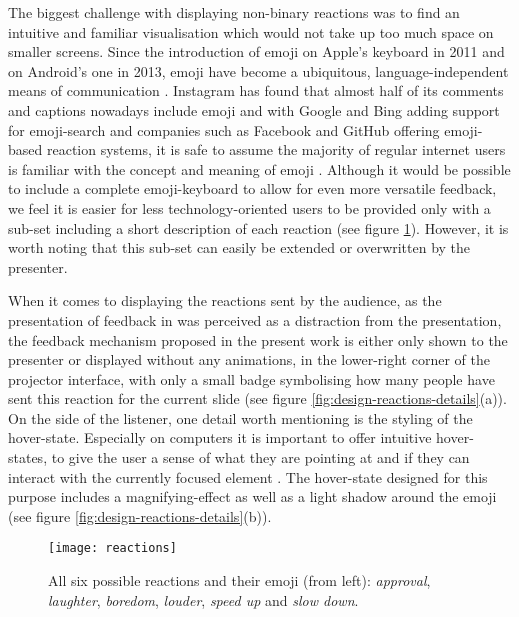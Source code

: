 The biggest challenge with displaying non-binary reactions was to find an intuitive and familiar visualisation which would not take up too much space on smaller screens. Since the introduction of emoji on Apple's keyboard in 2011 and on Android's one in 2013, emoji have become a ubiquitous, language-independent means of communication \cite{Instagramm:Emoji, Cappallo:ImageToEmoji}. Instagram has found that almost half of its comments and captions nowadays include emoji \cite{Instagramm:Emoji} and with Google \cite{Google:Emoji} and Bing \cite{Bing:Emoji} adding support for emoji-search and companies such as Facebook \cite{Facebook:Reactions} and GitHub \cite{Github:Reactions} offering emoji-based reaction systems, it is safe to assume the majority of regular internet users is familiar with the concept and meaning of emoji \cite{Cappallo:EmojiVideoSearch}. Although it would be possible to include a complete emoji-keyboard to allow for even more versatile feedback, we feel it is easier for less technology-oriented users to be provided only with a sub-set including a short description of each reaction (see figure \ref{fig:design-reactions}). However, it is worth noting that this sub-set can easily be extended or overwritten by the presenter.

When it comes to displaying the reactions sent by the audience, as the presentation of feedback in \cite{Teevan:MobileFeedbackDuringPresentation} was perceived as a distraction from the presentation, the feedback mechanism proposed in the present work is either only shown to the presenter or displayed without any animations, in the lower-right corner of the projector interface, with only a small badge symbolising how many people have sent this reaction for the current slide (see figure \ref{fig:design-reactions-details}(a)). On the side of the listener, one detail worth mentioning is the styling of the hover-state. Especially on computers it is important to offer intuitive hover-states, to give the user a sense of what they are pointing at and if they can interact with the currently focused element \cite{hover}. The hover-state designed for this purpose includes a magnifying-effect as well as a light shadow around the emoji (see figure \ref{fig:design-reactions-details}(b)).

\begin{figure}
\centering
\texttt{[image: reactions]}
\caption{All six possible reactions and their emoji (from left): \emph{approval}, \emph{laughter}, \emph{boredom}, \emph{louder}, \emph{speed up} and \emph{slow down}.}
\label{fig:design-reactions}
\end{figure}

